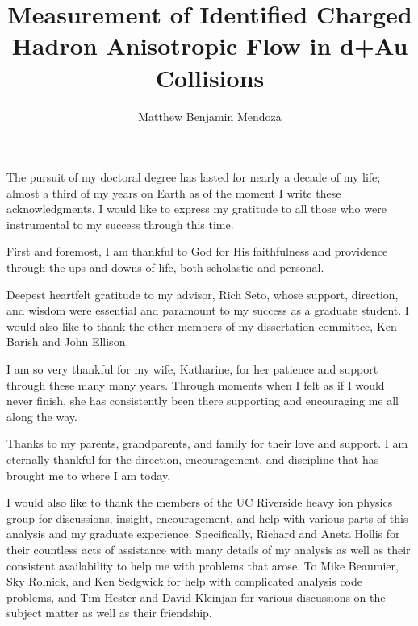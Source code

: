 \documentclass[oneside,final, letterpaper]{ucr}
\begin{document}

\title{Measurement of Identified Charged Hadron Anisotropic Flow in d+Au Collisions}
\author{Matthew Benjamin Mendoza}

\maketitle
\copyrightpage{}
\approvalpage{}


\begin{frontmatter}

\begin{acknowledgements}
The pursuit of my doctoral degree has lasted for nearly a decade of my life; almost a third of my years on Earth as of the moment I write these acknowledgments. I would like to express my gratitude to all those who were instrumental to my success through this time.

First and foremost, I am thankful to God for His faithfulness and providence through the ups and downs of life, both scholastic and personal.  

Deepest heartfelt gratitude to my advisor, Rich Seto, whose support, direction, and wisdom were essential and paramount to my success as a graduate student. I would also like to thank the other members of my dissertation committee, Ken Barish and John Ellison.

I am so very thankful for my wife, Katharine, for her patience and support through these many many years. Through moments when I felt as if I would never finish, she has consistently been there supporting and encouraging me all along the way.

Thanks to my parents, grandparents, and family for their love and support. I am eternally thankful for the direction, encouragement, and discipline that has brought me to where I am today. 

I would also like to thank the members of the UC Riverside heavy ion physics group for discussions, insight, encouragement, and help with various parts of this analysis and my graduate experience. Specifically, Richard and Aneta Hollis for their countless acts of assistance with many details of my analysis as well as their consistent availability to help me with problems that arose. To Mike Beaumier, Sky Rolnick, and Ken Sedgwick for help with complicated analysis code problems, and Tim Hester and David Kleinjan for various discussions on the subject matter as well as their friendship.


\end{acknowledgements}
\end{frontmatter}
\end{document}

